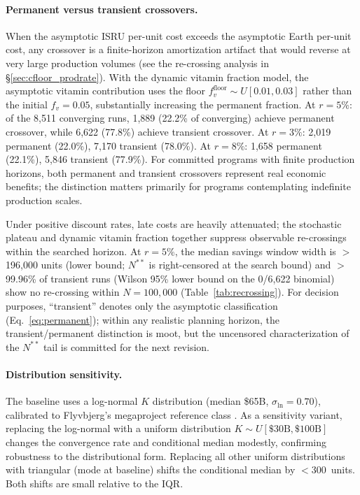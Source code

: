 \paragraph{Permanent versus transient crossovers.} When the asymptotic ISRU per-unit cost exceeds the asymptotic Earth per-unit cost, any crossover is a finite-horizon amortization artifact that would reverse at very large production volumes (see the re-crossing analysis in \S\ref{sec:cfloor_prodrate}). With the dynamic vitamin fraction model, the asymptotic vitamin contribution uses the floor $f_v^{\mathrm{floor}} \sim U[0.01, 0.03]$ rather than the initial $f_v = 0.05$, substantially increasing the permanent fraction. At $r = 5\%$: of the 8{,}511 converging runs, 1{,}889 (22.2\% of converging) achieve permanent crossover, while 6{,}622 (77.8\%) achieve transient crossover. At $r = 3\%$: 2{,}019 permanent (22.0\%), 7{,}170 transient (78.0\%). At $r = 8\%$: 1{,}658 permanent (22.1\%), 5{,}846 transient (77.9\%). For committed programs with finite production horizons, both permanent and transient crossovers represent real economic benefits; the distinction matters primarily for programs contemplating indefinite production scales.

Under positive discount rates, late costs are heavily attenuated; the stochastic plateau and dynamic vitamin fraction together suppress observable re-crossings within the searched horizon. At $r = 5\%$, the median savings window width is $>$196{,}000 units (lower bound; $N^{**}$ is right-censored at the search bound) and $>$99.96\% of transient runs (Wilson 95\% lower bound on the 0/6{,}622 binomial) show no re-crossing within $N = 100{,}000$ (Table~\ref{tab:recrossing}). For decision purposes, ``transient'' denotes only the asymptotic classification (Eq.~\ref{eq:permanent}); within any realistic planning horizon, the transient/permanent distinction is moot, but the uncensored characterization of the $N^{**}$ tail is committed for the next revision.

\paragraph{Distribution sensitivity.} The baseline uses a log-normal $K$ distribution (median \$65B, $\sigma_{\ln} = 0.70$), calibrated to Flyvbjerg's megaproject reference class \cite{flyvbjerg2014}. As a sensitivity variant, replacing the log-normal with a uniform distribution $K \sim U[\$30\text{B}, \$100\text{B}]$ changes the convergence rate and conditional median modestly, confirming robustness to the distributional form. Replacing all other uniform distributions with triangular (mode at baseline) shifts the conditional median by $<$300~units. Both shifts are small relative to the IQR.

